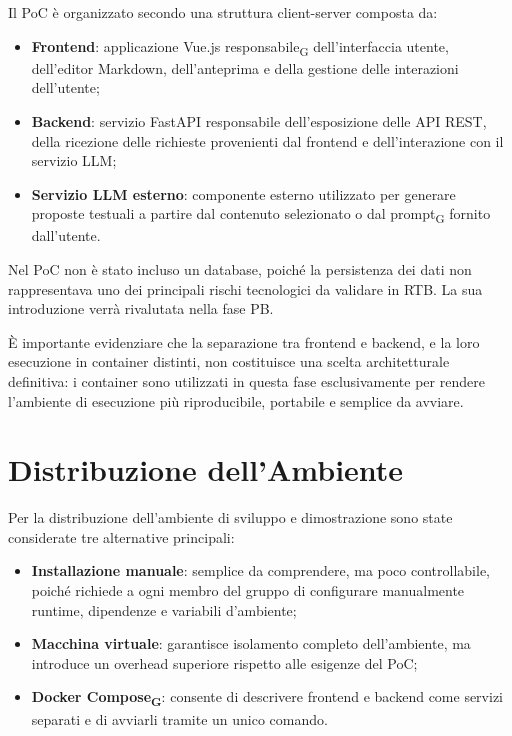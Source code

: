 Il PoC è organizzato secondo una struttura client-server composta da:

\begin{itemize}
    \item \textbf{Frontend}: applicazione Vue.js responsabile\textsubscript{G} dell'interfaccia utente,
    dell'editor Markdown, dell'anteprima e della gestione delle interazioni dell'utente;
    
    \item \textbf{Backend}: servizio FastAPI responsabile dell'esposizione delle API REST,
    della ricezione delle richieste provenienti dal frontend e dell'interazione con il servizio LLM;
    
    \item \textbf{Servizio LLM esterno}: componente esterno utilizzato per generare proposte
    testuali a partire dal contenuto selezionato o dal prompt\textsubscript{G} fornito dall'utente.
\end{itemize}

Nel PoC non è stato incluso un database, poiché la persistenza dei dati non rappresentava uno
dei principali rischi tecnologici da validare in RTB. La sua introduzione verrà rivalutata nella
fase PB.

È importante evidenziare che la separazione tra frontend e backend, e la loro esecuzione in
container distinti, non costituisce una scelta architetturale definitiva: i container sono utilizzati in questa fase esclusivamente per
rendere l'ambiente di esecuzione più riproducibile, portabile e semplice da avviare.


\section{Distribuzione dell'Ambiente}

Per la distribuzione dell'ambiente di sviluppo e dimostrazione sono state considerate tre
alternative principali:

\begin{itemize}
    \item \textbf{Installazione manuale}: semplice da comprendere, ma poco controllabile,
    poiché richiede a ogni membro del gruppo di configurare manualmente runtime, dipendenze
    e variabili d'ambiente;

    \item \textbf{Macchina virtuale}: garantisce isolamento completo dell'ambiente, ma introduce
    un overhead superiore rispetto alle esigenze del PoC;

    \item \textbf{Docker Compose\textsubscript{G}}: consente di descrivere frontend e backend come servizi separati
    e di avviarli tramite un unico comando.
\end{itemize}

